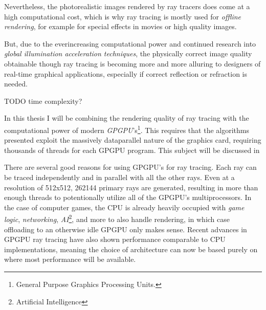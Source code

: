 Nevertheless, the photorealistic images rendered by ray tracers does
come at a high computational cost, which is why ray tracing is mostly
used for \textit{offline rendering}, for example for special effects in
movies or high quality images.



But, due to the everincreasing computational power and continued
research into \textit{global illumination acceleration techniques},
the physically correct image quality obtainable though ray tracing is
becoming more and more alluring to designers of real-time graphical
applications, especially if correct reflection or refraction is
needed.


TODO time complexity?


In this thesis I will be combining the rendering quality of ray
tracing with the computational power of modern
\textit{GPGPU}'s\footnote{General Purpose Graphics Processing
  Units.}. This requires that the algorithms presented exploit the
massively dataparallel nature of the graphics card, requiring
thousands of threads for each GPGPU program. This subject will be
discussed in 

There are several good reasons for using GPGPU's for ray tracing. Each
ray can be traced independently and in parallel with all the other
rays. Even at a resolution of 512x512, 262144 primary rays are
generated, resulting in more than enough threads to potentionally
utilize all of the GPGPU's multiprocessors. In the case of computer
games, the CPU is already heavily occupied with \textit{game logic},
\textit{networking}, \textit{AI}\footnote{Artificial Intelligence},
and more to also handle rendering, in which case offloading to an
otherwise idle GPGPU only makes sense. Recent advances in GPGPU ray
tracing have also shown performance comparable to CPU
implementations, meaning
the choice of architecture can now be based purely on where most
performance will be available.

